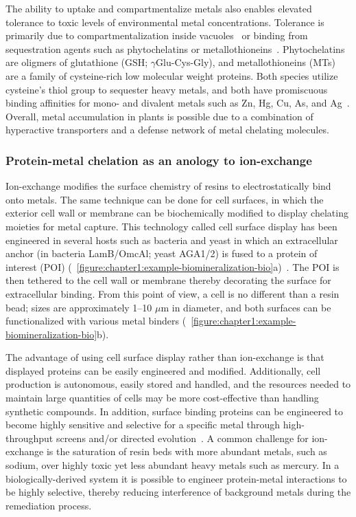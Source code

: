 \documentclass[../main/main]{subfiles}
\begin{document}
The ability to uptake and compartmentalize metals also enables elevated tolerance to toxic levels of environmental metal concentrations. Tolerance is primarily due to compartmentalization inside vacuoles~\cite{song2010arsenic} or binding from sequestration agents such as phytochelatins or metallothioneins~\cite{cobbett2002phytochelatins}. Phytochelatins are oligmers of glutathione (GSH; $\gamma$Glu-Cys-Gly), and metallothioneins (MTs) are a family of cysteine-rich low molecular weight proteins. Both species utilize cysteine's thiol group to sequester heavy metals, and both have promiscuous binding affinities for mono- and divalent metals such as Zn, Hg, Cu, As, and Ag~\cite{cobbett2002phytochelatins}. Overall, metal accumulation in plants is possible due to a combination of hyperactive transporters and a defense network of metal chelating molecules.
\clearpage %

\subsubsection*{Protein-metal chelation as an anology to ion-exchange}
Ion-exchange modifies the surface chemistry of resins to electrostatically bind onto metals. The same technique can be done for cell surfaces, in which the exterior cell wall or membrane can be biochemically modified to display chelating moieties for metal capture. This technology called cell surface display has been engineered in several hosts such as bacteria and yeast in which an extracellular anchor (in bacteria LamB/OmcAl; yeast AGA1/2) is fused to a protein of interest (POI) (\FIGURE~\ref{figure:chapter1:example-biomineralization-bio}a)~\cite{freudl1986cell,boder1997yeast}. The POI is then tethered to the cell wall or membrane thereby decorating the surface for extracellular binding.
From this point of view, a cell is no different than a resin bead; sizes are approximately 1--10 $\mu$m in diameter, and both surfaces can be functionalized with various metal binders (\FIGURE~\ref{figure:chapter1:example-biomineralization-bio}b).

The advantage of using cell surface display rather than ion-exchange is that displayed proteins can be easily engineered and modified. Additionally, cell production is autonomous, easily stored and handled, and the resources needed to maintain large quantities of cells may be more cost-effective than handling synthetic compounds. In addition, surface binding proteins can be engineered to become highly sensitive and selective for a specific metal through high-throughput screens and/or directed evolution~\cite{peelle2005}. A common challenge for ion-exchange is the saturation of resin beds with more abundant metals, such as sodium, over highly toxic yet less abundant heavy metals such as mercury. In a biologically-derived system it is possible to engineer protein-metal interactions to be highly selective, thereby reducing interference of background metals during the remediation process.
\end{document}
